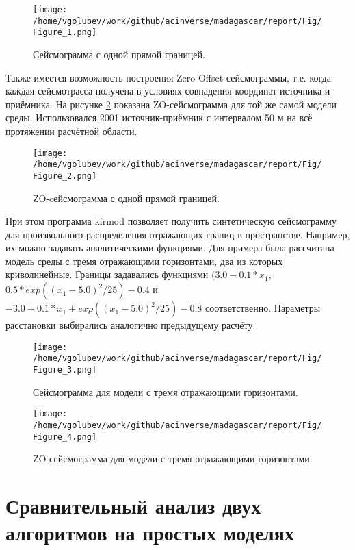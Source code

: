 \documentclass{article}
\begin{document}
\begin{figure}[ht]
  \center
  \texttt{[image: /home/vgolubev/work/github/acinverse/madagascar/report/Fig/Figure\_1.png]}
  \caption{Сейсмограмма с одной прямой границей.}
\label{seismo_1}
\end{figure}

Также имеется возможность построения Zero-Offset сейсмограммы, т.е. когда каждая сейсмотрасса получена в условиях совпадения координат источника и приёмника.
На рисунке \ref{seismo_2} показана ZO-сейсмограмма для той же самой модели среды.
Использовался 2001 источник-приёмник с интервалом 50 м на всё протяжении расчётной области.

\begin{figure}[ht]
  \center
  \texttt{[image: /home/vgolubev/work/github/acinverse/madagascar/report/Fig/Figure\_2.png]}
  \caption{ZO-cейсмограмма с одной прямой границей.}
\label{seismo_2}
\end{figure}

При этом программа kirmod позволяет получить синтетическую сейсмограмму для произвольного распределения отражающих границ в пространстве.
Например, их можно задавать аналитическими функциями.
Для примера была рассчитана модель среды с тремя отражающими горизонтами, два из которых криволинейные.
Границы задавались функциями $(3.0 - 0.1 * x_1$, $0.5 * exp((x_1 - 5.0)^2 / 25) - 0.4$ и $-3.0 + 0.1 * x_1 + exp((x_1 - 5.0)^2 / 25) - 0.8$ соответственно.
Параметры расстановки выбирались аналогично предыдущему расчёту.

\begin{figure}[ht]
  \center
  \texttt{[image: /home/vgolubev/work/github/acinverse/madagascar/report/Fig/Figure\_3.png]}
  \caption{Сейсмограмма для модели с тремя отражающими горизонтами.}
\label{seismo_3}
\end{figure}

\begin{figure}[ht]
  \center
  \texttt{[image: /home/vgolubev/work/github/acinverse/madagascar/report/Fig/Figure\_4.png]}
  \caption{ZO-сейсмограмма для модели с тремя отражающими горизонтами.}
\label{seismo_4}
\end{figure}

\fi

\section{Сравнительный анализ двух алгоритмов на простых моделях}
\end{document}
